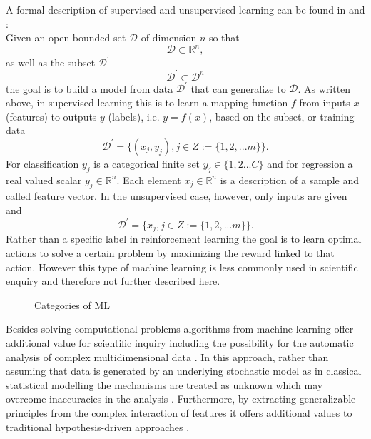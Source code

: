 A formal description of supervised and unsupervised learning can be found in \cite{Brunton_kutz_2019} and \cite{Murphy2012}:\\
Given an open bounded set \(\mathcal{D}\) of dimension \(n\) so that
\begin{equation}
    \mathcal{D}\subset\mathbb{R}^{n},
\end{equation}
as well as the subset \(\mathcal{D}^{'}\) 
\begin{equation}
    \mathcal{D}^{'}\subset\mathcal{D}^{n}
\end{equation}
the goal is to build a model from data \(\mathcal{D}^{'}\) that can generalize to \(\mathcal{D}\). As written above, in supervised learning this is to learn a mapping function \(f\) from inputs \(x\) (features) to outputs \(y\) (labels), i.e. \(y = f(x)\), based on the subset, or training data
\begin{equation}
    \mathcal{D}^{'}=\{(x_j, y_j), j \in Z := \{1,2,...m\}\}. 
\end{equation}
For classification \(y_j\) is a categorical finite set \(y_j \in \{1,2...C\}\) and for regression a real valued scalar \(y_j \in \mathbb R^{n}\). Each element \(x_j \in \mathbb R^{n}\) is a description of a sample and called feature vector.
In the unsupervised case, however, only inputs are given and 
\begin{equation}
    \mathcal{D}^{'}=\{x_j, j \in Z := \{1,2,...m\}\}. 
\end{equation}
Rather than a specific label in reinforcement learning the goal is to learn optimal actions to solve a certain problem by maximizing the reward linked to that action. However this type of machine learning is less commonly used in scientific enquiry and therefore not further described here.\\
\begin{figure*}[h]
  \caption{Categories of ML}
  \label{fig1:ml_types}
\end{figure*}
Besides solving computational problems algorithms from machine learning offer additional value for scientific inquiry including the possibility for the automatic analysis of complex multidimensional data \cite{Brunton2019,Breiman2001}. In this approach, rather than assuming that data is generated by an underlying stochastic model as in classical statistical modelling the mechanisms are treated as unknown which may overcome inaccuracies in the analysis \cite{Breiman2001}. Furthermore, by extracting generalizable principles from the complex interaction of features it offers additional values to traditional hypothesis-driven approaches \cite{Vu1601,Bzdok2017}.\\

